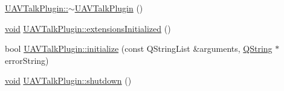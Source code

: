 \begin{DoxyCompactItemize}
\item 
\hyperlink{group___u_a_v_talk_plugin_gab4102ef2791ea82b9460336b06361158}{\-U\-A\-V\-Talk\-Plugin\-::$\sim$\-U\-A\-V\-Talk\-Plugin} ()
\item 
\hyperlink{group___u_a_v_objects_plugin_ga444cf2ff3f0ecbe028adce838d373f5c}{void} \hyperlink{group___u_a_v_talk_plugin_ga2b7202eb07a1d037f8e92eeedbc1621e}{\-U\-A\-V\-Talk\-Plugin\-::extensions\-Initialized} ()
\item 
bool \hyperlink{group___u_a_v_talk_plugin_ga311f58f272717ad544a6ca019a42f821}{\-U\-A\-V\-Talk\-Plugin\-::initialize} (const \-Q\-String\-List \&arguments, \hyperlink{group___u_a_v_objects_plugin_gab9d252f49c333c94a72f97ce3105a32d}{\-Q\-String} $\ast$error\-String)
\item 
\hyperlink{group___u_a_v_objects_plugin_ga444cf2ff3f0ecbe028adce838d373f5c}{void} \hyperlink{group___u_a_v_talk_plugin_ga67b3b23618210b3dfbf43dc1b0fa03b1}{\-U\-A\-V\-Talk\-Plugin\-::shutdown} ()
\end{DoxyCompactItemize}
